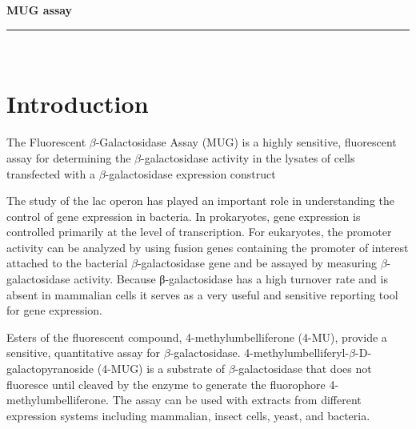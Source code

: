 \documentclass[a4paper,12pt]{article}
\newcommand{\protocol}{MUG assay}
\newcommand{\labtitle}{LAB TITLE}
\newcommand{\authorname}{YOURNAME}
\begin{document}
 
 
 
\begin{titlepage}
\begin{center}
{\LARGE \textbf{\protocol} \\ \vspace{4pt}}
\rule[13pt]{\textwidth}{1pt} \\ \vspace{150pt}
\end{center}
 
\end{titlepage}
 
\newpage
\thispagestyle{empty}           %
\tableofcontents
\clearpage                      %
 
\setcounter{page}{1}
 
\section{Introduction}
The Fluorescent $\beta$-Galactosidase Assay (MUG) is a highly sensitive, fluorescent assay for determining the $\beta$-galactosidase activity in the lysates of cells transfected with a $\beta$-galactosidase expression construct
 
The study of the lac operon has played an important role in understanding the control of gene expression in bacteria. In prokaryotes, gene expression is controlled primarily at the level of transcription. For eukaryotes, the promoter activity can be analyzed by using fusion genes containing the promoter of interest attached to the bacterial $\beta$-galactosidase gene and be assayed by measuring $\beta$-galactosidase activity. Because β-galactosidase has a high turnover rate and is absent in mammalian cells it serves as a very useful and sensitive reporting tool for gene expression.
 
Esters of the fluorescent compound, 4-methylumbelliferone (4-MU), provide a sensitive, quantitative assay for $\beta$-galactosidase.  4-methylumbelliferyl-$\beta$-D-galactopyranoside (4-MUG) is a substrate of $\beta$-galactosidase that does not fluoresce until cleaved by the enzyme to generate the fluorophore 4-methylumbelliferone.  The assay can be used with extracts from different expression systems including mammalian, insect cells, yeast, and bacteria.
 
\end{document}
